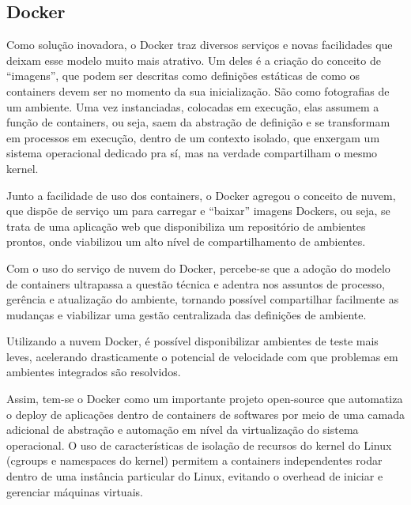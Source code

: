 \subsection{Docker}
Como solução inovadora, o Docker traz diversos serviços e novas 
facilidades que deixam esse modelo muito mais atrativo. Um deles 
é a criação do conceito de “imagens”, que podem ser descritas como 
definições estáticas de como os containers devem ser no momento da 
sua inicialização. São como fotografias de um ambiente. Uma vez 
instanciadas, colocadas em execução, elas assumem a função de 
containers, ou seja, saem da abstração de definição e se transformam 
em processos em execução, dentro de um contexto isolado, que 
enxergam um sistema operacional dedicado pra sí, mas na verdade 
compartilham o mesmo kernel.

Junto a facilidade de uso dos containers, o Docker agregou o 
conceito de nuvem, que dispõe de serviço um para carregar e 
“baixar” imagens Dockers, ou seja, se trata de uma aplicação 
web que disponibiliza um repositório de ambientes prontos, 
onde viabilizou um alto nível de compartilhamento de ambientes.

Com o uso do serviço de nuvem do Docker, percebe-se que a 
adoção do modelo de containers ultrapassa a questão técnica 
e adentra nos assuntos de processo, gerência e atualização 
do ambiente, tornando possível compartilhar facilmente as 
mudanças e viabilizar uma gestão centralizada das definições 
de ambiente.

Utilizando a nuvem Docker, é possível disponibilizar ambientes de 
teste mais leves, acelerando drasticamente o potencial de velocidade 
com que problemas em ambientes integrados são resolvidos.

Assim, tem-se o Docker como um importante projeto open-source 
que automatiza o deploy de aplicações dentro de containers de 
softwares por meio de uma camada adicional de abstração e automação 
em nível da virtualização do sistema operacional. O uso de 
características de isolação de recursos do kernel do Linux 
(cgroups e namespaces do kernel) permitem a containers 
independentes rodar dentro de uma instância particular do Linux, 
evitando o overhead de iniciar e gerenciar máquinas virtuais.
